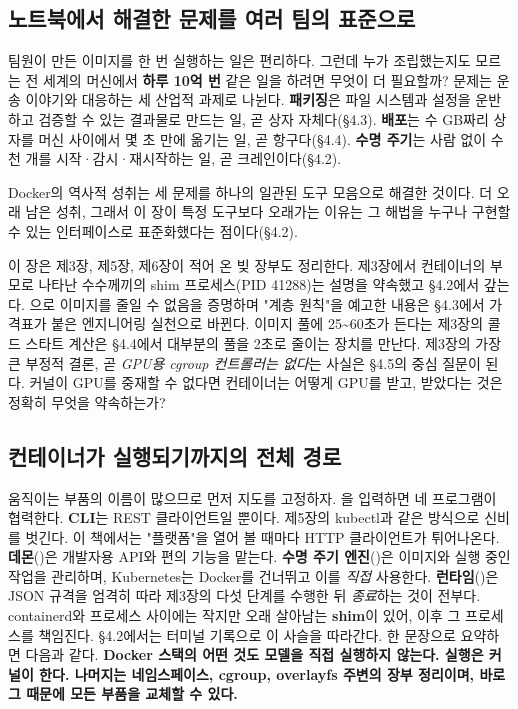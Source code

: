 \subsection*{노트북에서 해결한 문제를 여러 팀의 표준으로}

팀원이 만든 이미지를 한 번 실행하는 일은 편리하다. 그런데 누가 조립했는지도 모르는 전 세계의 머신에서 \textbf{하루 10억 번} 같은 일을 하려면 무엇이 더 필요할까? 문제는 운송 이야기와 대응하는 세 산업적 과제로 나뉜다. \textbf{패키징}은 파일 시스템과 설정을 운반하고 검증할 수 있는 결과물로 만드는 일, 곧 상자 자체다(§4.3). \textbf{배포}는 수 GB짜리 상자를 머신 사이에서 몇 초 만에 옮기는 일, 곧 항구다(§4.4). \textbf{수명 주기}는 사람 없이 수천 개를 시작·감시·재시작하는 일, 곧 크레인이다(§4.2).

Docker의 역사적 성취는 세 문제를 하나의 일관된 도구 모음으로 해결한 것이다. 더 오래 남은 성취, 그래서 이 장이 특정 도구보다 오래가는 이유는 그 해법을 누구나 구현할 수 있는 인터페이스로 표준화했다는 점이다(§4.2).

이 장은 제3장, 제5장, 제6장이 적어 온 빚 장부도 정리한다. 제3장에서 컨테이너의 부모로 나타난 수수께끼의 shim 프로세스(PID 41288)는 설명을 약속했고 §4.2에서 갚는다. 으로 이미지를 줄일 수 없음을 증명하며 "계층 원칙"을 예고한 내용은 §4.3에서 가격표가 붙은 엔지니어링 실천으로 바뀐다. 이미지 풀에 25\textasciitilde{}60초가 든다는 제3장의 콜드 스타트 계산은 §4.4에서 대부분의 풀을 2초로 줄이는 장치를 만난다. 제3장의 가장 큰 부정적 결론, 곧 \textit{GPU용 cgroup 컨트롤러는 없다}는 사실은 §4.5의 중심 질문이 된다. 커널이 GPU를 중재할 수 없다면 컨테이너는 어떻게 GPU를 받고, 받았다는 것은 정확히 무엇을 약속하는가?

\subsection*{컨테이너가 실행되기까지의 전체 경로}

움직이는 부품의 이름이 많으므로 먼저 지도를 고정하자. 을 입력하면 네 프로그램이 협력한다. \textbf{CLI}는 REST 클라이언트일 뿐이다. 제5장의 kubectl과 같은 방식으로 신비를 벗긴다. 이 책에서는 "플랫폼"을 열어 볼 때마다 HTTP 클라이언트가 튀어나온다. \textbf{데몬}()은 개발자용 API와 편의 기능을 맡는다. \textbf{수명 주기 엔진}()은 이미지와 실행 중인 작업을 관리하며, Kubernetes는 Docker를 건너뛰고 이를 \textit{직접} 사용한다. \textbf{런타임}()은 JSON 규격을 엄격히 따라 제3장의 다섯 단계를 수행한 뒤 \textit{종료}하는 것이 전부다. containerd와 프로세스 사이에는 작지만 오래 살아남는 \textbf{shim}이 있어, 이후 그 프로세스를 책임진다. §4.2에서는 터미널 기록으로 이 사슬을 따라간다. 한 문장으로 요약하면 다음과 같다. \textbf{Docker 스택의 어떤 것도 모델을 직접 실행하지 않는다. 실행은 커널이 한다. 나머지는 네임스페이스, cgroup, overlayfs 주변의 장부 정리이며, 바로 그 때문에 모든 부품을 교체할 수 있다.}

